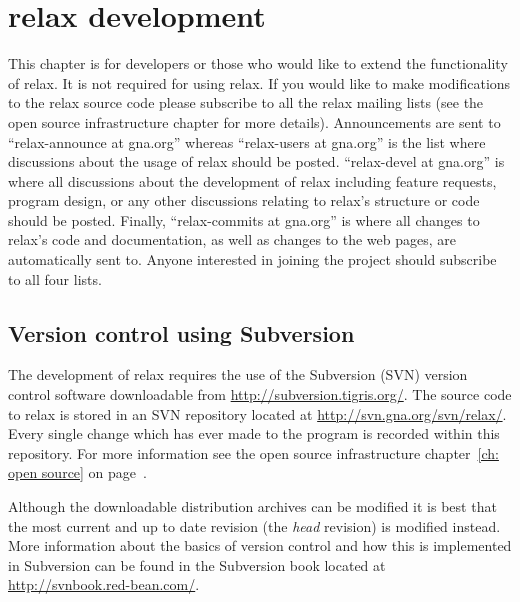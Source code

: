 
\chapter{relax development} \label{ch: relax devel}

This chapter is for developers or those who would like to extend the functionality of relax.
It is not required for using relax.
If you would like to make modifications to the relax source code please subscribe to all the relax mailing lists (see the open source infrastructure chapter for more details).
Announcements are sent to ``relax-announce at gna.org'' whereas ``relax-users at gna.org'' is the list where discussions about the usage of relax should be posted.
``relax-devel at gna.org'' is where all discussions about the development of relax including feature requests, program design, or any other discussions relating to relax's structure or code should be posted.
Finally, ``relax-commits at gna.org'' is where all changes to relax's code and documentation, as well as changes to the web pages, are automatically sent to.
Anyone interested in joining the project should subscribe to all four lists.




\section{Version control using Subversion}\label{svn repository}

The development of relax requires the use of the Subversion (SVN) version control software downloadable from \href{http://subversion.tigris.org/}{http://subversion.tigris.org/}.
The source code to relax is stored in an SVN repository located at \href{http://svn.gna.org/svn/relax/}{http://svn.gna.org/svn/relax/}.
Every single change which has ever made to the program is recorded within this repository.
For more information see the open source infrastructure chapter~\ref{ch: open source} on page~\pageref{ch: open source}.

Although the downloadable distribution archives can be modified it is best that the most current and up to date revision (the \textit{head} revision) is modified instead.
More information about the basics of version control and how this is implemented in Subversion can be found in the Subversion book located at \href{http://svnbook.red-bean.com/}{http://svnbook.red-bean.com/}.

